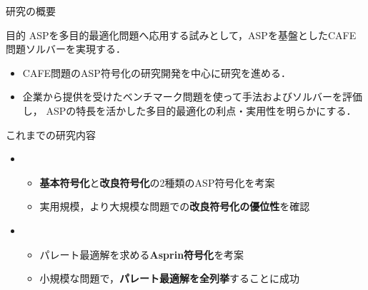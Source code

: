 \documentclass[dvipdfmx, 11pt]{beamer}
\begin{document}
\begin{frame}{研究の概要}
 \begin{alertblock}{目的}
  ASPを多目的最適化問題へ応用する試みとして，ASPを基盤としたCAFE問題ソルバーを実現する．
 \end{alertblock}
 \begin{itemize}
  \item CAFE問題のASP符号化の研究開発を中心に研究を進める．
  \item 企業から提供を受けたベンチマーク問題を使って手法およびソルバーを評価し，
	ASPの特長を活かした多目的最適化の利点・実用性を明らかにする．
 \end{itemize}
 \begin{block}{これまでの研究内容}
  \begin{itemize}
   \item {}
	 \begin{itemize}
	  \item {\bf 基本符号化}と{\bf 改良符号化}の2種類のASP符号化を考案
	  \item 実用規模，より大規模な問題での{\bf 改良符号化の優位性}を確認
	 \end{itemize}
   \item {}
	 \begin{itemize}
	  \item パレート最適解を求める{\bf Asprin符号化}を考案
	  \item 小規模な問題で，{\bf パレート最適解を全列挙}することに成功
	 \end{itemize}
  \end{itemize}
 
 \end{block}
\end{frame}
\end{document}
